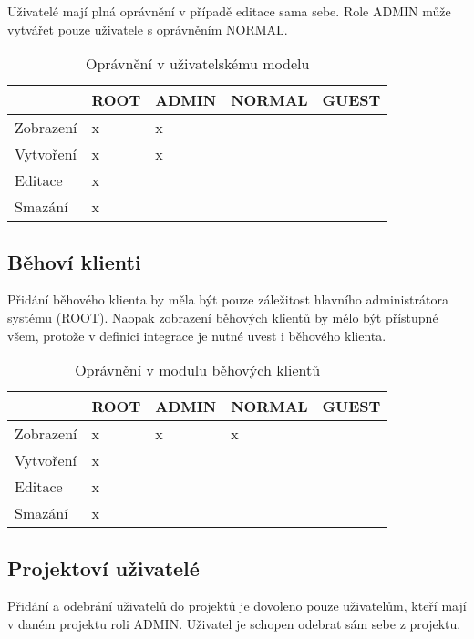 Uživatelé mají plná oprávnění v případě editace sama sebe.
Role ADMIN může vytvářet pouze uživatele s oprávněním NORMAL.

\begin{table}[h]
\centering
\caption{Oprávnění v uživatelskému modelu}
\begin{tabular}{|l|l|l|l|l|}
\hline
       & ROOT & ADMIN & NORMAL & GUEST \\ \hline
Zobrazení   & x    & x     &        &       \\ \hline
Vytvoření & x    & x     &        &       \\ \hline
Editace   & x    &       &        &       \\ \hline
Smazání & x    &       &        &       \\ \hline
\end{tabular}
\end{table}

\subsection{Běhoví klienti}

Přidání běhového klienta by měla být pouze záležitost hlavního administrátora systému (ROOT).
Naopak zobrazení běhových klientů by mělo být přístupné všem, protože v definici integrace je nutné uvest i běhového klienta.

\begin{table}[h]
\centering
\caption{Oprávnění v modulu běhových klientů}
\begin{tabular}{|l|l|l|l|l|}
\hline
       & ROOT & ADMIN & NORMAL & GUEST \\ \hline
Zobrazení   & x    & x     & x      &       \\ \hline
Vytvoření & x    &       &        &       \\ \hline
Editace   & x    &       &        &       \\ \hline
Smazání & x    &       &        &      \\ \hline
\end{tabular}
\end{table}

\subsection{Projektoví uživatelé}

Přidání a odebrání uživatelů do projektů je dovoleno pouze uživatelům, kteří mají v daném projektu roli ADMIN.
Uživatel je schopen odebrat sám sebe z projektu.


